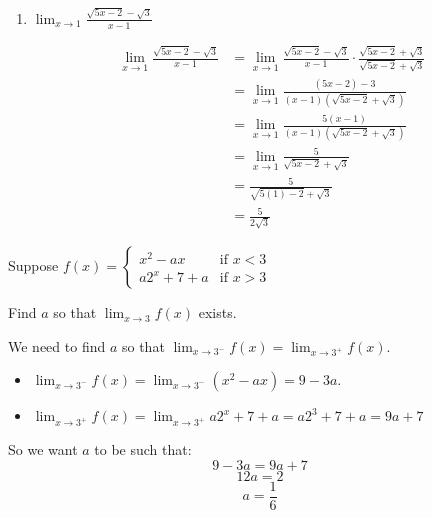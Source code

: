 \documentclass[handout,nooutcomes]{ximera}
\begin{document}
\begin{problem}
\begin{enumerate}
	
	\item  $ \lim_{x \to 1} \frac{\sqrt{5x-2} - \sqrt{3}}{x-1} $
	\begin{freeResponse}
	\begin{align*}
	\lim_{x \to 1} \frac{\sqrt{5x-2} - \sqrt{3}}{x-1} &= \lim_{x \to 1} \frac{\sqrt{5x-2} - \sqrt{3}}{x-1} \cdot \frac{\sqrt{5x-2} + \sqrt{3}}{\sqrt{5x-2} + \sqrt{3}} \\
	&= \lim_{x \to 1} \frac{(5x-2)-3}{(x-1)(\sqrt{5x-2} + \sqrt{3})} \\
	&= \lim_{x \to 1} \frac{5(x-1)}{(x-1)(\sqrt{5x-2} + \sqrt{3})} \\
	&= \lim_{x \to 1} \frac{5}{\sqrt{5x-2} + \sqrt{3}} \\
	&=   \frac{5}{\sqrt{5(1)-2} + \sqrt{3}} \\
	&= \frac{5}{2 \sqrt{3}} 
	\end{align*}
	\end{freeResponse}
	\end{enumerate}
\end{problem}
	
	
	
	
			
			

\begin{problem}
Suppose
	$f(x) =   \left\{ \begin{array}{lr}
	x^2 - ax 	&	\text{if } x < 3	\\
	a2^x + 7 + a	&	\text{if } x > 3	\end{array} \right.  $
	
	Find $a$ so that $ \lim_{x \to 3} f(x)  $ exists.
	\begin{freeResponse}
	 We need to find $a$ so that $\lim_{x \to 3^-} f(x) = \lim_{x \to 3^+} f(x) $.  
	
	\begin{itemize}
	
	\item  $\lim_{x \to 3^-} f(x) = \lim_{x \to 3^-} (x^2 - ax) = 9 - 3a $.
	
	\item  $\lim_{x \to 3^+} f(x) = \lim_{x \to 3^+} a2^x + 7 + a = a2^3 + 7 + a = 9a + 7 $
	
	\end{itemize}
	
	So we want $a$ to be such that:
	$$ 9-3a = 9a+7 $$
	$$12a = 2 $$
	$$a = \frac{1}{6}   $$
	\end{freeResponse}
\end{problem}
	
\end{document}
